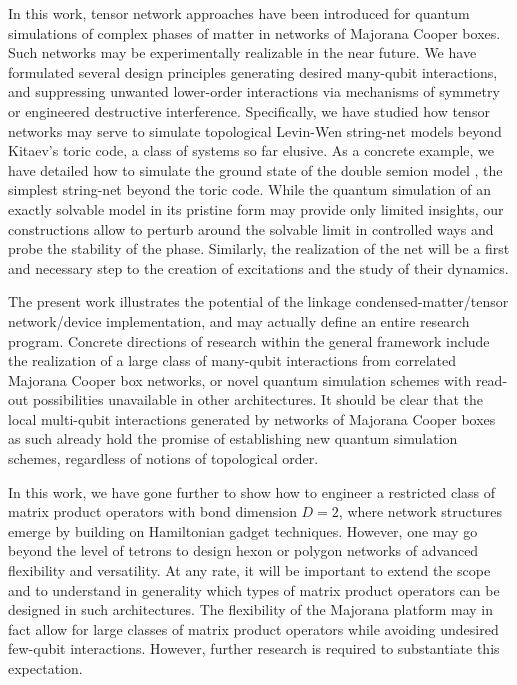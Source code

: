 \documentclass[twocolumn,floats,prx,showpacs]{revtex4-1}
\begin{document}
In this work, tensor network approaches have been introduced for quantum simulations of complex phases of matter in networks of Majorana Cooper boxes.  Such networks may be experimentally realizable in the near future. We have formulated several design principles generating desired  many-qubit interactions, and suppressing unwanted lower-order interactions via mechanisms of symmetry or engineered destructive interference. 
Specifically, we have studied how tensor networks may serve to simulate topological Levin-Wen string-net models \cite{Levin2005,Wen2017} beyond Kitaev's toric code, a class of systems so far elusive.   As a concrete  example, we have detailed how to simulate the ground state of the double semion model \cite{Levin2005}, the  simplest string-net beyond the toric code.  While the quantum simulation of an exactly solvable model in its pristine form may  provide only limited insights,  our constructions  allow to perturb around the solvable limit in controlled ways and probe the stability of the phase. Similarly, the realization of the net will be a first and necessary step to the creation of excitations and the study of their dynamics.


The present work illustrates the potential of the linkage condensed-matter/tensor network/device implementation, and may actually define an
entire research program. Concrete  directions of research within the general framework include the realization of a   large class of many-qubit interactions from correlated Majorana Cooper box networks, or novel quantum simulation schemes \cite{CiracZollerSimulation,Roadmap} with read-out possibilities \cite{Plugge2017,Karzig2017} unavailable in other architectures.  It should be clear that the local multi-qubit interactions generated by  networks of Majorana Cooper boxes as such already hold the promise of establishing new quantum simulation schemes, regardless of
notions of topological order.

In this work, we have gone further to show how to engineer a restricted class of matrix product operators with bond dimension $D=2$, where network structures emerge by building on Hamiltonian gadget techniques. However, one may go beyond the level of tetrons to design hexon or polygon networks of advanced flexibility and versatility.  At any rate, it will be important to extend the scope and to understand in generality  which types of matrix product operators can be designed in such architectures. The flexibility of the Majorana platform may in fact allow for large classes of matrix product operators while  avoiding undesired few-qubit interactions.  However, further research is required to substantiate this expectation. 
\end{document}
